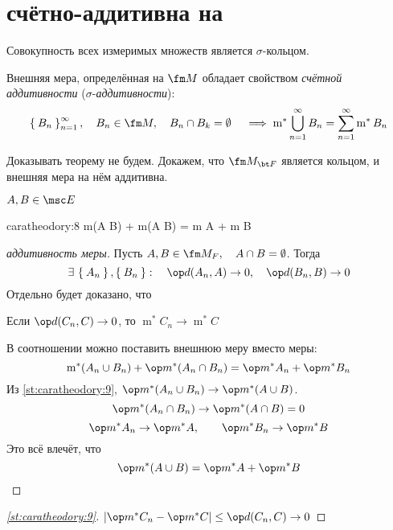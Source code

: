 \section{ счётно-аддитивна на }

\begin{theorem}
	Совокупность всех измеримых множеств является $ \sigma $-кольцом.

	Внешняя мера, определённая на $ \fm M $ обладает свойством \emph{счётной аддитивности} ($ \sigma $-\emph{аддитивности}):
	$$ \set{B_n}_{n = 1}^\infty, \quad B_n \in \fm M, \quad B_n \cap B_k = \O \quad \implies \operatorname m^* \bigcup_{n = 1}^\infty B_n = \sum_{n = 1}^\infty \operatorname m^* B_n $$
\end{theorem}

Доказывать теорему не будем. Докажем, что $ \fm M_{\bt F} $ является кольцом, и внешняя мера на нём аддитивна.

\begin{statement}
	$ A, B \in \msc E $
	\begin{equ}{caratheodory:8}
		\op m(A \cup B) + \op m(A \cap B) = \op m A + \op m B
	\end{equ}
\end{statement}

\begin{proof}[аддитивность меры]
	Пусть $ A, B \in \fm M_F, \quad A \cap B = \O $. Тогда
	$$ \exist \set{A_n}, \set{B_n} : \quad \op d(A_n, A) \to 0, \quad \op d(B_n, B) \to 0 $$
	Отдельно будет доказано, что
	\begin{statement}\label{st:caratheodory:9}
		Если $ \op d(C_n, C) \to 0 $, то $ \operatorname m^* C_n \to \operatorname m^* C $
	\end{statement}
	В соотношении  можно поставить внешнюю меру вместо меры:
	$$ \operatorname m^*(A_n \cup B_n) + \op m^*(A_n \cap B_n) = \op m^* A_n + \op m^* B_n $$
	Из \autoref{st:caratheodory:9}, $ \op m^*(A_n \cup B_n) \to \op m^*(A \cup B) $.
	$$ \op m^*(A_n \cap B_n) \to \op m^*(A \cap B) = 0 $$
	$$ \op m^* A_n \to \op m^* A, \qquad \op m^* B_n \to \op m^* B $$
	Это всё влечёт, что
	$$ \op m^*(A \cup B) = \op m^* A + \op m^* B $$
\end{proof}

\vspace{0.5em}

\begin{proof}[\autoref{st:caratheodory:9}]
	$ |\op m^* C_n - \op m^* C| \le \op d(C_n, C) \to 0 $
\end{proof}

